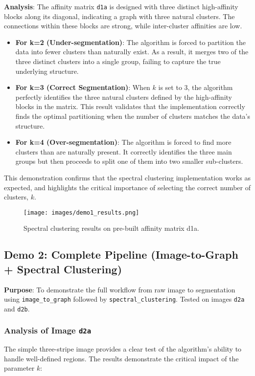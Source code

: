\documentclass[12pt,a4paper]{article}
\begin{document}
{\textbf{Analysis}: The affinity matrix \texttt{d1a} is designed with three distinct high-affinity blocks along its diagonal, indicating a graph with three natural clusters. The connections within these blocks are strong, while inter-cluster affinities are low.
\begin{itemize}
    \item \textbf{For k=2 (Under-segmentation)}: The algorithm is forced to partition the data into fewer clusters than naturally exist. As a result, it merges two of the three distinct clusters into a single group, failing to capture the true underlying structure.
    \item \textbf{For k=3 (Correct Segmentation)}: When $k$ is set to 3, the algorithm perfectly identifies the three natural clusters defined by the high-affinity blocks in the matrix. This result validates that the implementation correctly finds the optimal partitioning when the number of clusters matches the data's structure.
    \item \textbf{For k=4 (Over-segmentation)}: The algorithm is forced to find more clusters than are naturally present. It correctly identifies the three main groups but then proceeds to split one of them into two smaller sub-clusters.
\end{itemize}
This demonstration confirms that the spectral clustering implementation works as expected, and highlights the critical importance of selecting the correct number of clusters, $k$.


\begin{figure}[H]
    \centering
    \texttt{[image: images/demo1\_results.png]}
    \caption{Spectral clustering results on pre-built affinity matrix d1a.}
    \label{fig:demo1}
\end{figure}


\subsection{Demo 2: Complete Pipeline (Image-to-Graph + Spectral Clustering)}
\textbf{Purpose}: To demonstrate the full workflow from raw image to segmentation using \texttt{image\_to\_graph} followed by \texttt{spectral\_clustering}. Tested on images \texttt{d2a} and \texttt{d2b}.

\subsubsection{Analysis of Image \texttt{d2a}}
The simple three-stripe image provides a clear test of the algorithm's ability to handle well-defined regions. The results demonstrate the critical impact of the parameter $k$:

}
\end{document}
